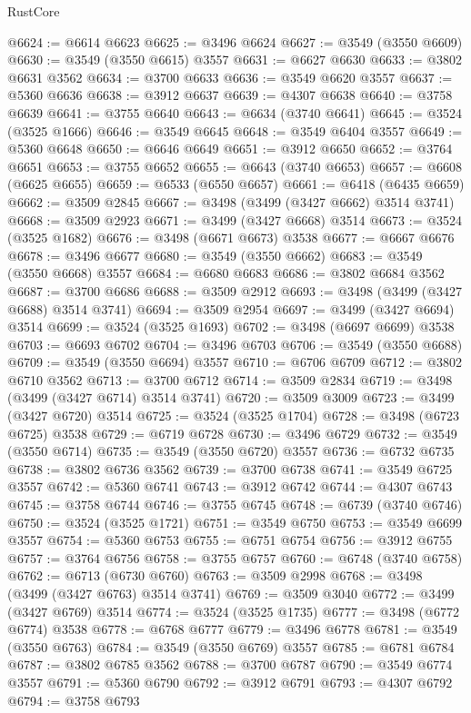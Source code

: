 \begin{lexlean}{RustCore}
\begin{coremodule}
@6624 := @6614 @6623
@6625 := @3496 @6624
@6627 := @3549 (@3550 @6609)
@6630 := @3549 (@3550 @6615) @3557
@6631 := @6627 @6630
@6633 := @3802 @6631 @3562
@6634 := @3700 @6633
@6636 := @3549 @6620 @3557
@6637 := @5360 @6636
@6638 := @3912 @6637
@6639 := @4307 @6638
@6640 := @3758 @6639
@6641 := @3755 @6640
@6643 := @6634 (@3740 @6641)
@6645 := @3524 (@3525 @1666)
@6646 := @3549 @6645
@6648 := @3549 @6404 @3557
@6649 := @5360 @6648
@6650 := @6646 @6649
@6651 := @3912 @6650
@6652 := @3764 @6651
@6653 := @3755 @6652
@6655 := @6643 (@3740 @6653)
@6657 := @6608 (@6625 @6655)
@6659 := @6533 (@6550 @6657)
@6661 := @6418 (@6435 @6659)
@6662 := @3509 @2845
@6667 := @3498 (@3499 (@3427 @6662) @3514 @3741)
@6668 := @3509 @2923
@6671 := @3499 (@3427 @6668) @3514
@6673 := @3524 (@3525 @1682)
@6676 := @3498 (@6671 @6673) @3538
@6677 := @6667 @6676
@6678 := @3496 @6677
@6680 := @3549 (@3550 @6662)
@6683 := @3549 (@3550 @6668) @3557
@6684 := @6680 @6683
@6686 := @3802 @6684 @3562
@6687 := @3700 @6686
@6688 := @3509 @2912
@6693 := @3498 (@3499 (@3427 @6688) @3514 @3741)
@6694 := @3509 @2954
@6697 := @3499 (@3427 @6694) @3514
@6699 := @3524 (@3525 @1693)
@6702 := @3498 (@6697 @6699) @3538
@6703 := @6693 @6702
@6704 := @3496 @6703
@6706 := @3549 (@3550 @6688)
@6709 := @3549 (@3550 @6694) @3557
@6710 := @6706 @6709
@6712 := @3802 @6710 @3562
@6713 := @3700 @6712
@6714 := @3509 @2834
@6719 := @3498 (@3499 (@3427 @6714) @3514 @3741)
@6720 := @3509 @3009
@6723 := @3499 (@3427 @6720) @3514
@6725 := @3524 (@3525 @1704)
@6728 := @3498 (@6723 @6725) @3538
@6729 := @6719 @6728
@6730 := @3496 @6729
@6732 := @3549 (@3550 @6714)
@6735 := @3549 (@3550 @6720) @3557
@6736 := @6732 @6735
@6738 := @3802 @6736 @3562
@6739 := @3700 @6738
@6741 := @3549 @6725 @3557
@6742 := @5360 @6741
@6743 := @3912 @6742
@6744 := @4307 @6743
@6745 := @3758 @6744
@6746 := @3755 @6745
@6748 := @6739 (@3740 @6746)
@6750 := @3524 (@3525 @1721)
@6751 := @3549 @6750
@6753 := @3549 @6699 @3557
@6754 := @5360 @6753
@6755 := @6751 @6754
@6756 := @3912 @6755
@6757 := @3764 @6756
@6758 := @3755 @6757
@6760 := @6748 (@3740 @6758)
@6762 := @6713 (@6730 @6760)
@6763 := @3509 @2998
@6768 := @3498 (@3499 (@3427 @6763) @3514 @3741)
@6769 := @3509 @3040
@6772 := @3499 (@3427 @6769) @3514
@6774 := @3524 (@3525 @1735)
@6777 := @3498 (@6772 @6774) @3538
@6778 := @6768 @6777
@6779 := @3496 @6778
@6781 := @3549 (@3550 @6763)
@6784 := @3549 (@3550 @6769) @3557
@6785 := @6781 @6784
@6787 := @3802 @6785 @3562
@6788 := @3700 @6787
@6790 := @3549 @6774 @3557
@6791 := @5360 @6790
@6792 := @3912 @6791
@6793 := @4307 @6792
@6794 := @3758 @6793

\end{coremodule}
\end{lexlean}
